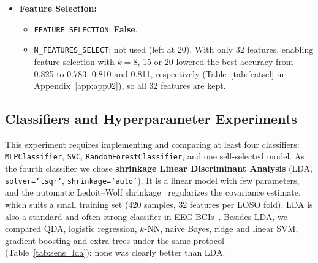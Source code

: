 \begin{itemize}[leftmargin=*]
\begin{itemize}
        \item \textbf{Feature Selection:}
        \begin{itemize}
            \item \texttt{FEATURE\_SELECTION}: \textbf{False}.
            \item \texttt{N\_FEATURES\_SELECT}: not used (left at 20). With only 32 features, enabling feature selection with $k=8$, 15 or 20 lowered the best accuracy from 0.825 to 0.783, 0.810 and 0.811, respectively (Table~\ref{tab:featsel} in Appendix~\ref{app:app02}), so all 32 features are kept.
        \end{itemize}
    \end{itemize}
\end{itemize}

\subsection{Classifiers and Hyperparameter Experiments}
This experiment requires implementing and comparing at least four classifiers: \texttt{MLPClassifier}, \texttt{SVC}, \texttt{RandomForestClassifier}, and one self-selected model. As the fourth classifier we chose \textbf{shrinkage Linear Discriminant Analysis} (LDA, \texttt{solver='lsqr'}, \texttt{shrinkage='auto'}). It is a linear model with few parameters, and the automatic Ledoit--Wolf shrinkage~\cite{ledoit2004} regularizes the covariance estimate, which suits a small training set (420 samples, 32 features per LOSO fold). LDA is also a standard and often strong classifier in EEG BCIs~\cite{lotte2018review}. Besides LDA, we compared QDA, logistic regression, $k$-NN, naive Bayes, ridge and linear SVM, gradient boosting and extra trees under the same protocol (Table~\ref{tab:sens_lda}); none was clearly better than LDA.

